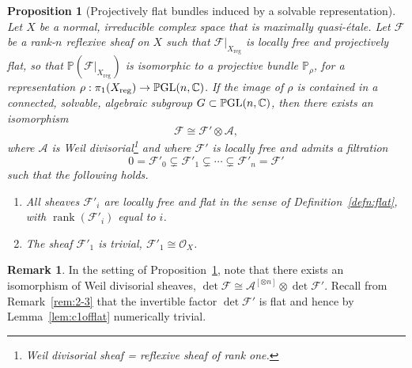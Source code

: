 \documentclass[JEP,XML,SOM,Unicode,published]{cedram}
\let\scr\mathscr
\newenvironment{enumeraten}
{\begin{enumerate}\setcounter{enumi}{\value{equation}}\itemindent0pt}
{\setcounter{equation}{\value{enumi}}\end{enumerate}}
\theoremstyle{plain}
\newtheorem{prop}[thm]{Proposition}
\theoremstyle{definition}
\newtheorem{rem}[thm]{Remark}
\numberwithin{equation}{thm}
\numberwithin{enumi}{thm}
\DeclareMathOperator{\rank}{rank}
\newcommand{\reg}{\mathrm{reg}}
\DeclareMathOperator{\GL}{GL}
\DeclareMathOperator{\PGL}{\bP\negthinspace\GL}
\newcommand{\sA}{\scr{A}}
\newcommand{\sF}{\scr{F}}
\newcommand{\sO}{\scr{O}}
\newcommand{\bC}{\mathbb{C}}
\newcommand{\bP}{\mathbb{P}}
\begin{document}
\begin{prop}[Projectively flat bundles induced by a solvable representation]\label{prop:pfbisr}
Let $X$ be a normal, irreducible complex space that is maximally quasi-étale.
Let $\sF$ be a rank-{}$n$ reflexive sheaf on $X$ such that $\sF|_{X_{\reg}}$ is
locally free and projectively flat, so that $\bP(\sF|_{X_{\reg}})$ is isomorphic
to a projective bundle $\bP_\rho$, for a representation
$\rho : \pi_1(X_{\reg}) \to \PGL(n,\bC)$. If the image of $\rho$ is contained in a
connected, solvable, algebraic subgroup $G \subset \PGL(n,\bC)$, then there exists an
isomorphism
\begin{equation}\label{eq:OmegaFA0-1}
\sF \cong \sF' \otimes \sA,
\end{equation}
where $\sA$ is Weil divisorial\footnote{Weil divisorial sheaf = reflexive sheaf of rank one.} and where $\sF'$ is locally free and admits a filtration
\begin{equation}\label{eq:3-3-2}
0 = \sF'_0 \subsetneq \sF'_1 \subsetneq \cdots \subsetneq \sF'_n = \sF'
\end{equation}
such that the following holds.
\begin{enumeraten}
\item\label{il:x1} All sheaves $\sF'_i$ are locally free and flat in the sense
of Definition~\ref{defn:flat}, with $\rank (\sF'_i)$ equal to $i$.

\item\label{il:x2} The sheaf $\sF'_1$ is trivial, $\sF'_1 \cong \sO_X$.
\end{enumeraten}
\end{prop}

\begin{rem}\label{rem:pfbisr}
In the setting of Proposition~\ref{prop:pfbisr}, note that there exists an
isomorphism of Weil divisorial sheaves, $\det \sF \cong \sA^{[\otimes n]} \otimes \det \sF'$.
Recall from Remark~\ref{rem:2-3} that the invertible factor $\det \sF'$ is flat
and hence by Lemma~\ref{lem:c1offlat} numerically trivial.
\end{rem}
\end{document}
